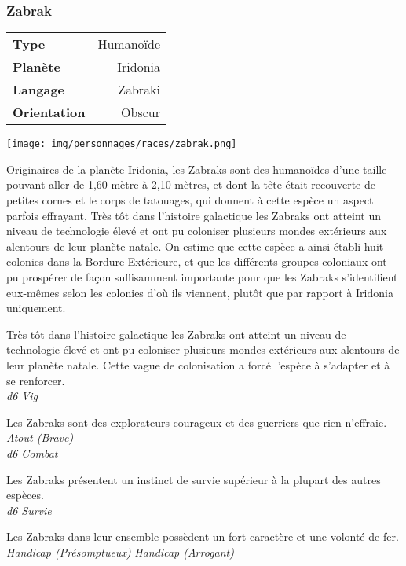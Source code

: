 \subsubsection{Zabrak}
\begin{samepage}
	\begin{flushright}
		\begin{tabular}{|l|r|}
			\textbf{Type} 			& Humanoïde \\
		   	\textbf{Planète} 		& Iridonia \\
		   	\textbf{Langage} 		& Zabraki \\
		   	\textbf{Orientation} 	& Obscur \\
		\end{tabular}
	\end{flushright}
	\vspace{-6\baselineskip}
	\texttt{[image: img/personnages/races/zabrak.png]}
\end{samepage}

Originaires de la planète Iridonia, les Zabraks sont des humanoïdes d’une taille pouvant aller de 1,60 mètre à 2,10 mètres, et dont la tête était recouverte de petites cornes et le corps de tatouages, qui donnent à cette espèce un aspect parfois effrayant. Très tôt dans l’histoire galactique les Zabraks ont atteint un niveau de technologie élevé et ont pu coloniser plusieurs mondes extérieurs aux alentours de leur planète natale. On estime que cette espèce a ainsi établi huit colonies dans la Bordure Extérieure, et que les différents groupes coloniaux ont pu prospérer de façon suffisamment importante pour que les Zabraks s’identifient eux-mêmes selon les colonies d’où ils viennent, plutôt que par rapport à Iridonia uniquement.

\begin{description}[align=left]
	\item [Endurance] 				%
		Très tôt dans l’histoire galactique les Zabraks ont atteint un niveau de technologie élevé et ont pu coloniser plusieurs mondes extérieurs aux alentours de leur planète natale. Cette vague de colonisation a forcé l’espèce à s’adapter et à se renforcer.\\
		\textit{d6 Vig}

	\item [Braveheart] 				%
		Les Zabraks sont des explorateurs courageux et des guerriers que rien n’effraie.\\
		\textit{Atout (Brave)}\\
		\textit{d6 Combat}

	\item [Survivor] 				%
		Les Zabraks présentent un instinct de survie supérieur à la plupart des autres espèces.\\
		\textit{d6 Survie}

	\item [Fierté mal placé] 				%
		Les Zabraks dans leur ensemble possèdent un fort caractère et une volonté de fer.\\
		\textit{Handicap (Présomptueux)}
		\textit{Handicap (Arrogant)}
\end{description}